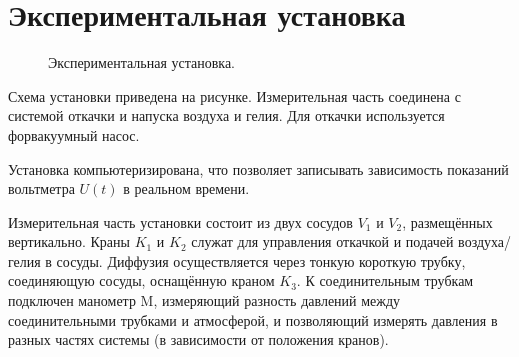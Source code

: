 \documentclass[a4paper,12pt]{article} %
\begin{document}
\section{Экспериментальная установка}

\begin{figure}[h]
\caption{Экспериментальная установка.}
\end{figure}


\noindent Схема установки приведена на рисунке. Измерительная часть соединена с системой откачки и напуска воздуха и гелия. Для откачки используется форвакуумный насос.

\medskip

\noindent Установка компьютеризирована, что позволяет записывать зависимость показаний вольтметра $ U(t) $ в реальном времени.

\medskip

\noindent Измерительная часть установки состоит из двух сосудов $ V_1 $ и $ V_2 $, размещённых вертикально. Краны $ K_1 $ и $ K_2 $ служат для управления откачкой и подачей воздуха/гелия в сосуды. Диффузия осуществляется через тонкую короткую трубку, соединяющую сосуды, оснащённую краном $ K_3 $. К соединительным трубкам подключен манометр M, измеряющий разность давлений между соединительными трубками и атмосферой, и позволяющий измерять давления в разных частях системы (в зависимости от положения кранов).
\end{document}
